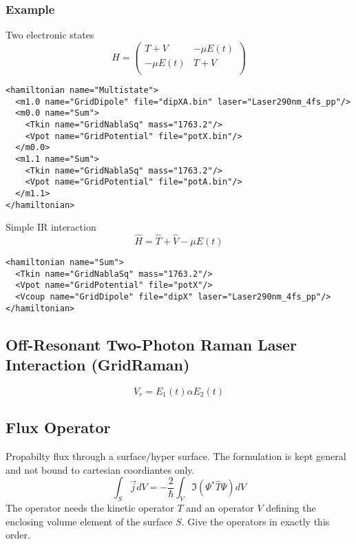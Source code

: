 \documentclass[a4paper,12pt]{scrbook}
\begin{document}
\subsubsection*{Example}
Two electronic states
\begin{equation}
 \hat H = \begin{pmatrix}T + V & -\mu E(t) \\ -\mu E(t) & T + V\\\end{pmatrix}
\end{equation}
\begin{verbatim}
<hamiltonian name="Multistate">
  <m1.0 name="GridDipole" file="dipXA.bin" laser="Laser290nm_4fs_pp"/>
  <m0.0 name="Sum">
    <Tkin name="GridNablaSq" mass="1763.2"/>
    <Vpot name="GridPotential" file="potX.bin"/>
  </m0.0>
  <m1.1 name="Sum">
    <Tkin name="GridNablaSq" mass="1763.2"/>
    <Vpot name="GridPotential" file="potA.bin"/>
  </m1.1>
</hamiltonian>
\end{verbatim}
Simple IR interaction
\begin{equation}
 \hat H = \hat T + \hat V  -\mu E(t)
\end{equation}
\begin{verbatim}
<hamiltonian name="Sum">
  <Tkin name="GridNablaSq" mass="1763.2"/>
  <Vpot name="GridPotential" file="potX"/>
  <Vcoup name="GridDipole" file="dipX" laser="Laser290nm_4fs_pp"/>
</hamiltonian>
\end{verbatim}

\subsection{Off-Resonant Two-Photon Raman Laser Interaction (GridRaman)}
\begin{equation}
V_r = E_1(t) \alpha E_2(t)
\end{equation}

\subsection{Flux Operator}
Propabilty flux through a surface/hyper surface. The formulation
is kept general and not bound to cartesian coordiantes only.
\begin{equation}
 \int_S \vec{j} dV = -\frac{2}{\hbar} \int_V \Im(\Psi^* \hat T \Psi)dV
\end{equation}
The operator needs the kinetic operator $T$ and an operator $V$
defining the enclosing volume element of the surface $S$.
Give the operators in exactly this order.
\end{document}
